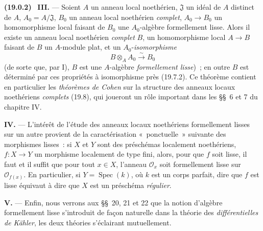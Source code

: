 \documentclass[10pt,oneside]{book}
\makeatletter
\newcommand{\setmanualcurrentlabel}[1]{\def\@currentlabel{#1}}
\newenvironment{env}[1][]{\setmanualcurrentlabel{#1}\par\medskip\noindent\textbf{(#1)}\ }{\par}
\makeatother
\begin{document}
\begin{env}[19.0.2]
\medskip\noindent\textbf{III.} --- Soient $A$ un anneau local noethérien,
$\mathfrak J$ un idéal de $A$ distinct de $A$, $A_0=A/\mathfrak J$, $B_0$ un
anneau local noethérien \emph{complet}, $A_0\to B_0$ un homomorphisme local
faisant de $B_0$ une $A_0$-algèbre formellement lisse. Alors il existe un
anneau local noethérien \emph{complet} $B$, un homomorphisme local $A\to B$
faisant de $B$ un $A$-module plat, et un $A_0$-\emph{isomorphisme}
\[
  B\otimes_A A_0\xrightarrow{\sim}B_0
\]
(de sorte que, par I), $B$ est une $A$-algèbre \emph{formellement lisse})~; en
outre $B$ est déterminé par ces propriétés à isomorphisme près (19.7.2). Ce
théorème contient en particulier les \emph{théorèmes de Cohen} sur la structure
des anneaux locaux noethériens \emph{complets} (19.8), qui joueront un rôle
important dans les §§~6 et 7 du chapitre IV.

\medskip\noindent\textbf{IV.} --- L'intérêt de l'étude des anneaux locaux
noethériens formellement lisses sur un autre provient de la caractérisation
«~ponctuelle~» suivante des morphismes lisses~: si $X$ et $Y$ sont des
préschémas localement noethériens, $f:X\to Y$ un morphisme localement de type
fini, alors, pour que $f$ soit lisse, il faut et il suffit que pour tout
$x\in X$, l'anneau $\mathcal O_x$ soit formellement lisse sur
$\mathcal O_{f(x)}$. En particulier, si $Y=\operatorname{Spec}(k)$, où $k$ est
un corps parfait, dire que $f$ est lisse équivaut à dire que $X$ est un
préschéma \emph{régulier}.

\medskip\noindent\textbf{V.} --- Enfin, nous verrons aux §§~20, 21 et 22 que
la notion d'algèbre formellement lisse s'introduit de façon naturelle dans la
théorie des \emph{différentielles de Kähler}, les deux théories s'éclairant
mutuellement.
\end{env}
\end{document}
